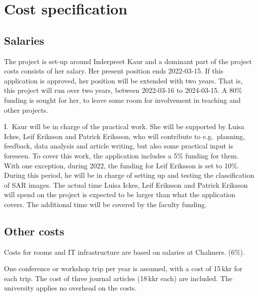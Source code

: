 \documentclass[12pt,oneside,a4paper]{article}
\begin{document}
\thispagestyle{empty}


\section*{Cost specification}

\subsection*{Salaries}
%
The project is set-up around Inderpreet Kaur and a dominant part of the
project costs consists of her salary. Her present position ends 2022-03-15. If
this application is approved, her position will be extended with two years.
That is, this project will run over two years, between 2022-03-16 to
2024-03-15. A 80\% funding is sought for her, to leave some room for involvement in 
teaching and other projects.

I.\ Kaur will be in charge of the practical work. She will be supported by
Luisa Ickes, Leif Eriksson and Patrick Eriksson, who will contribute to e.g.\
planning, feedback, data analysis and article writing, but also some practical
input is foreseen. To cover this work, the application includes a 5\% funding
for them. With one exception, during 2022, the funding for Leif Eriksson is set to 10\%. During this period, he will be in charge of setting up and testing the classification of SAR images. The actual time Luisa Ickes, Leif Eriksson and Patrick Eriksson will spend on the project is expected to be larger than what the application covers. The additional time will be covered by the faculty funding.




\subsection*{Other costs}
%
Costs for rooms and IT infrastructure are based on salaries at Chalmers.
(6\%).

One conference or workshop trip per year is assumed, with a cost of 15\,kkr for
each trip. The cost of three journal articles (18\,kkr each) are included. The
university applies no overhead on the costs.
\end{document}
